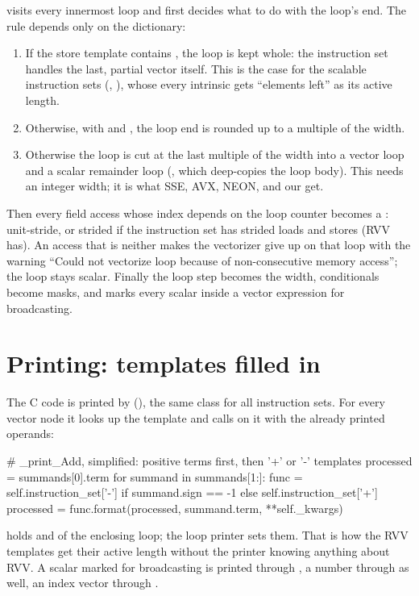  visits every innermost loop and
first decides what to do with the loop's end. The rule depends only on the dictionary:
\begin{enumerate}
  \item If the store template contains , the loop is kept whole:
    the instruction set handles the last, partial vector itself. This is the case for
    the scalable instruction sets (, ), whose every intrinsic gets
    ``elements left'' as its active length.
  \item Otherwise, with  and ,
    the loop end is rounded up to a multiple of the width.
  \item Otherwise the loop is cut at the last multiple of the width into a vector loop
    and a scalar remainder loop (, which deep-copies the loop body). This
    needs an integer width; it is what SSE, AVX, NEON,  and our
     get.
\end{enumerate}
Then every field access whose index depends on the loop counter becomes a
: unit-stride, or strided if the instruction set has strided
loads and stores (RVV has). An access that is neither makes the vectorizer give up on
that loop with the warning ``Could not vectorize loop because of non-consecutive memory
access''; the loop stays scalar. Finally the loop step becomes the width, conditionals
become masks, and  marks every scalar inside a vector
expression for broadcasting.

\section{Printing: templates filled in}\label{r04:sec:printer}

The C code is printed by 
(), the same class for all instruction sets. For every
vector node it looks up the template and calls  on it with the already
printed operands:
\begin{pycode}
# _print_Add, simplified: positive terms first, then '+' or '-' templates
processed = summands[0].term
for summand in summands[1:]:
    func = self.instruction_set['-'] if summand.sign == -1 else self.instruction_set['+']
    processed = func.format(processed, summand.term, **self._kwargs)
\end{pycode}
 holds  and  of the enclosing
loop; the loop printer sets them. That is how the RVV templates get their active length
 without the printer knowing anything about RVV.
A scalar marked for broadcasting is printed through , a number
through  as well, an index vector through .


